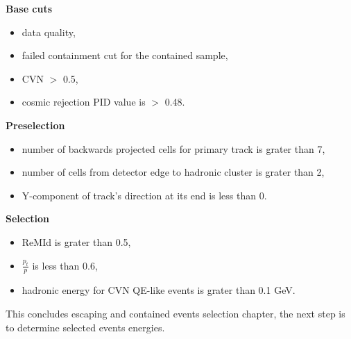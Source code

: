 \textbf{Base cuts}
\begin{itemize}
\item data quality,
\item failed containment cut for the contained sample,
\item CVN $>$ 0.5,
\item cosmic rejection PID value is $>$ 0.48.
\end{itemize}

\textbf{Preselection}
\begin{itemize}
\item number of backwards projected cells for primary track is grater than 7,
\item number of cells from detector edge to hadronic cluster is grater than 2,
\item Y-component of track's direction at its end is less than 0.
\end{itemize}

\textbf{Selection}
\begin{itemize}
\item ReMId is grater than 0.5,
\item $\frac{p_t}{p}$ is less than 0.6,
\item hadronic energy for CVN QE-like events is grater than 0.1 GeV.
\end{itemize}

This concludes escaping and contained events selection chapter, the next step is to determine selected events energies.
